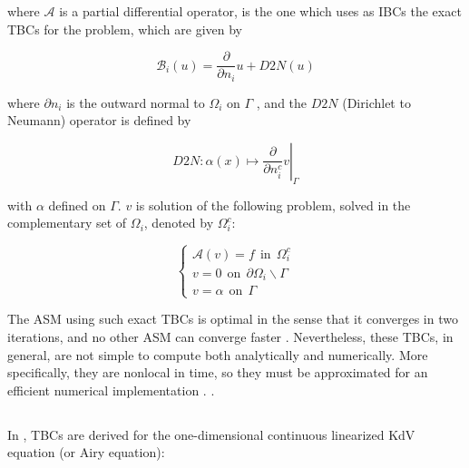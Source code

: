 \noindent where $\mathcal{A}$ is a partial differential operator, is the one which uses as IBCs the exact TBCs for the problem, which are given by

$$\mathcal{B}_i(u) = \frac{\partial}{\partial n_i}u + D2N(u)$$

\noindent where $\partial n_i$ is the outward normal to $\Omega_i$ on $\Gamma$ , and the $D2N$ (Dirichlet to Neumann) operator is defined by

$$\left. D2N : \alpha(x) \mapsto \frac{\partial}{\partial n_i^c}v \right\rvert_\Gamma$$

\noindent with $\alpha$ defined on $\Gamma$. $v$ is solution of the following problem, solved in the complementary set of $\Omega_i$, denoted by $\Omega_i^c$:

\begin{equation*}
\begin{cases}
\mathcal{A}(v) = f \ \ \text{in} \ \ \Omega_i^c\\
v = 0 \ \ \text{on} \ \ \partial \Omega_i \backslash \Gamma \\
v = \alpha \ \ \text{on} \ \ \Gamma
\end{cases}
\end{equation*}

\indent The ASM using such exact TBCs is optimal in the sense that it converges in two iterations, and no other ASM can converge faster \cite{Japhet2003}. Nevertheless, these TBCs, in general, are not simple to compute both analytically and numerically. More specifically, they are nonlocal in time, so they must be approximated for an efficient numerical implementation \cite{Xavieretal2008}.  \cite{besse2015}.  

\subsection{}
\label{sec:TBC}

\indent In \cite{besse2015}, TBCs are derived for the one-dimensional continuous linearized KdV equation (or Airy equation):

